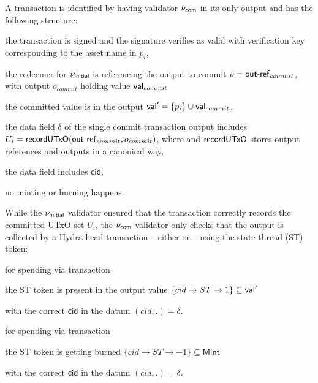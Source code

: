 A \mtxCom{} transaction is identified by having validator $\nu_\mathsf{com}$ in its
  only output and has the following structure:
\begin{menumerate}
    \item the transaction is signed and the signature verifies as valid with
    verification key corresponding to the asset name in $p_i$,
    \item the redeemer for $\nu_\mathsf{initial}$ is referencing the output to commit $ \rho = \mathsf{out\textsf{-}{}ref}_{commit}$, with output $o_{commit}$ holding value $\mathsf{val}_{commit}$
    \item the committed value is in the output $\mathsf{val}' = \{p_{i}\} \cup \mathsf{val}_{commit} $,
    \item the data field $\delta$ of the single commit transaction output includes \\
    $U_i = \mathsf{recordUTxO}(\mathsf{out\textsf{-}{}ref}_{commit},o_{commit})$, where and $\mathsf{recordUTxO}$
    stores output references and outputs in a canonical way, 
    \item the data field includes $\mathsf{cid}$, 
    \item no minting or burning happens.
\end{menumerate}

While the $\nu_\mathsf{initial}$ validator ensured that the \mtxCommit{} transaction
correctly records the committed UTxO set $U_i$, the $\nu_\mathsf{com}$ validator only
checks that the output is collected by a Hydra head transaction -- either
\mtxCCom{} or \mtxAbort{} -- using the state thread (ST) token:

\begin{menumerate}
  \item for spending via \mtxCom{} transaction
    \begin{menumerate}
      \item the ST token is present in the output value $\{cid \rightarrow ST \rightarrow 1\} \subseteq \mathsf{val}'$
      \item with the correct $\mathsf{cid}$ in the datum $(cid,.) = \delta$.
    \end{menumerate}
  \item for spending via \mtxAbort{} transaction
    \begin{menumerate}
      \item the ST token is getting burned $\{cid \rightarrow ST \rightarrow -1\} \subseteq \mathsf{Mint}$
      \item with the correct $\mathsf{cid}$ in the datum $(cid,.) = \delta$.
    \end{menumerate}
\end{menumerate}

